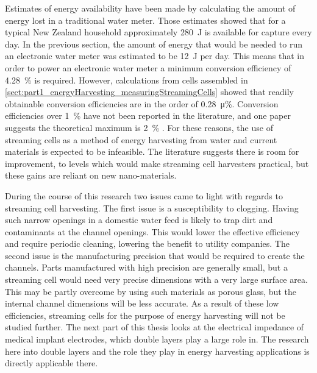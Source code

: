 
Estimates of energy availability have been made by calculating the amount of energy lost in a traditional water meter.
Those estimates showed that for a typical New Zealand household approximately \SI{280}{\joule} is available for capture every day.
In the previous section, the amount of energy that would be needed to run an electronic water meter was estimated to be \SI{12}{\joule} per day.
This means that in order to power an electronic water meter a minimum conversion efficiency of \SI{4.28}{\percent} is required.
However, calculations from cells assembled in \cref{sect:part1_energyHarvesting_measuringStreamingCells} showed that readily obtainable conversion efficiencies are in the order of \SI{0.28}{\micro\percent}.
Conversion efficiencies over \SI{1}{\percent} have not been reported in the literature, and one paper suggests the theoretical maximum is \SI{2}{\percent} \cite{VanderHeyden2006}.
For these reasons, the use of streaming cells as a method of energy harvesting from water and current materials is expected to be infeasible.
The literature suggests there is room for improvement, to levels which would make streaming cell harvesters practical, but these gains are reliant on new nano-materials.

During the course of this research two issues came to light with regards to streaming cell harvesting.
The first issue is a susceptibility to clogging.
Having such narrow openings in a domestic water feed is likely to trap dirt and contaminants at the channel openings.
This would lower the effective efficiency and require periodic cleaning, lowering the benefit to utility companies.
The second issue is the manufacturing precision that would be required to create the channels.
Parts manufactured with high precision are generally small, but a streaming cell would need very precise dimensions with a very large surface area.
This may be partly overcome by using such materials as porous glass, but the internal channel dimensions will be less accurate.
As a result of these low efficiencies, streaming cells for the purpose of energy harvesting will not be studied further.
The next part of this thesis looks at the electrical impedance of medical implant electrodes, which double layers play a large role in.
The research here into double layers and the role they play in energy harvesting applications is directly applicable there.

